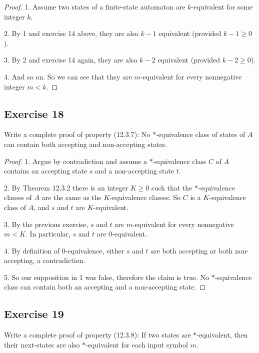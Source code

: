 \documentclass[14pt]{extarticle}
\begin{document}
\begin{proof}
1. Assume two states of a finite-state automaton are \(k\)-equivalent for some integer \(k\).

2. By 1 and exercise 14 above, they are also \(k-1\) equivalent (provided \(k-1 \geq 0\)).

3. By 2 and exercise 14 again, they are also \(k-2\) equivalent (provided \(k-2 \geq 0\)).

4. And so on. So we can see that they are \(m\)-equivalent for every nonnegative integer \(m < k\).
\end{proof}

\subsection{Exercise 18}
Write a complete proof of property (12.3.7): No \(*\)-equivalence class of states of \(A\) can contain both 
accepting and non-accepting states.

\begin{proof}
1. Argue by contradiction and assume a \(*\)-equivalence class \(C\) of \(A\) contains an accepting state \(s\) and a 
non-accepting state \(t\).

2. By Theorem 12.3.2 there is an integer \(K \geq 0\) such that the \(*\)-equivalence classes of \(A\) are the same as
the \(K\)-equivalence classes. So \(C\) is a \(K\)-equivalence class of \(A\), and \(s\) and \(t\) are \(K\)-equivalent.

3. By the previous exercise, \(s\) and \(t\) are \(m\)-equivalent for every nonnegative \(m < K\). In particular,
\(s\) and \(t\) are 0-equivalent.

4. By definition of 0-equivalence, either \(s\) and \(t\) are both accepting or both non-accepting, a contradiction.

5. So our supposition in 1 was false, therefore the claim is true. No \(*\)-equivalence class can contain both an accepting
and a non-accepting state.
\end{proof}

\subsection{Exercise 19}
Write a complete proof of property (12.3.8): If two states are \(*\)-equivalent, then their next-states are also 
\(*\)-equivalent for each input symbol \(m\).
\end{document}
